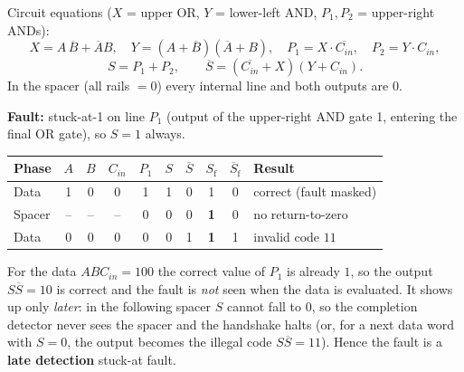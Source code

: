 \documentclass[a4paper, 10pt]{article}
\begin{document}
\begin{solution}
	\noindent Circuit equations (\(X\) = upper OR, \(Y\) = lower-left AND, \(P_1, P_2\) = upper-right ANDs):
	\[
		X = A\,\overline{B} + \overline{A}B,\quad
		Y = (A+\overline{B})(\overline{A}+B),\quad
		P_1 = X\cdot\overline{C_{in}},\quad P_2 = Y\cdot C_{in},
	\]
	\[
		S = P_1 + P_2,\qquad \overline{S} = (\overline{C_{in}} + X)(Y + C_{in}).
	\]
	In the spacer (all rails \(=0\)) every internal line and both outputs are \(0\).

	\myspace

	\noindent\textbf{Fault:} stuck-at-1 on line \(P_1\) (output of the upper-right AND gate 1, entering the final OR gate), so \(S = 1\) always.
	\begin{center}
		\begin{tabular}{l|ccc|c|cc|cc|l}
			\toprule
			Phase & \(A\) & \(B\) & \(C_{in}\) & \(P_1\) & \(S\) & \(\overline{S}\) & \(S_{\text{f}}\) & \(\overline{S}_{\text{f}}\) & Result \\
			\midrule
			Data   & 1 & 0 & 0 & 1 & 1 & 0 & 1 & 0 & correct (fault masked) \\
			Spacer & -- & -- & -- & 0 & 0 & 0 & \textbf{1} & 0 & no return-to-zero \\
			Data   & 0 & 0 & 0 & 0 & 0 & 1 & \textbf{1} & 1 & invalid code \(11\) \\
			\bottomrule
		\end{tabular}
	\end{center}
	For the data \(A B C_{in} = 100\) the correct value of \(P_1\) is already \(1\), so the output \(S\overline{S}=10\) is correct and the fault is \emph{not} seen when the data is evaluated.
	It shows up only \emph{later}: in the following spacer \(S\) cannot fall to \(0\), so the completion detector never sees the spacer and the handshake halts
	(or, for a next data word with \(S = 0\), the output becomes the illegal code \(S\overline{S} = 11\)).
	Hence the fault is a \textbf{late detection} stuck-at fault.
\end{solution}

\newpage
\end{document}
